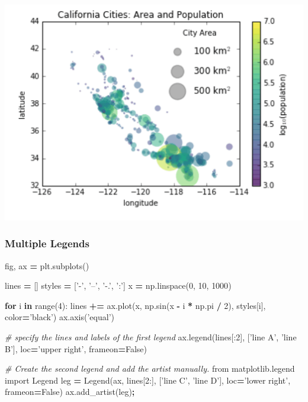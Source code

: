 \documentclass[]{book}
\newenvironment{Shaded}{\begin{snugshade}}{\end{snugshade}}
\newcommand{\BuiltInTok}[1]{#1}
\newcommand{\CommentTok}[1]{\textcolor[rgb]{0.56,0.35,0.01}{\textit{#1}}}
\newcommand{\ControlFlowTok}[1]{\textcolor[rgb]{0.13,0.29,0.53}{\textbf{#1}}}
\newcommand{\DecValTok}[1]{\textcolor[rgb]{0.00,0.00,0.81}{#1}}
\newcommand{\ImportTok}[1]{#1}
\newcommand{\KeywordTok}[1]{\textcolor[rgb]{0.13,0.29,0.53}{\textbf{#1}}}
\newcommand{\NormalTok}[1]{#1}
\newcommand{\OperatorTok}[1]{\textcolor[rgb]{0.81,0.36,0.00}{\textbf{#1}}}
\newcommand{\StringTok}[1]{\textcolor[rgb]{0.31,0.60,0.02}{#1}}
\newcommand{\VariableTok}[1]{\textcolor[rgb]{0.00,0.00,0.00}{#1}}
\begin{document}
\includegraphics{images/legend4.png}

\hypertarget{multiple-legends}{%
\subsubsection{Multiple Legends}\label{multiple-legends}}

\begin{Shaded}
\begin{Highlighting}[]
\NormalTok{fig, ax }\OperatorTok{=}\NormalTok{ plt.subplots()}

\NormalTok{lines }\OperatorTok{=}\NormalTok{ []}
\NormalTok{styles }\OperatorTok{=}\NormalTok{ [}\StringTok{'-'}\NormalTok{, }\StringTok{'--'}\NormalTok{, }\StringTok{'-.'}\NormalTok{, }\StringTok{':'}\NormalTok{]}
\NormalTok{x }\OperatorTok{=}\NormalTok{ np.linspace(}\DecValTok{0}\NormalTok{, }\DecValTok{10}\NormalTok{, }\DecValTok{1000}\NormalTok{)}

\ControlFlowTok{for}\NormalTok{ i }\KeywordTok{in} \BuiltInTok{range}\NormalTok{(}\DecValTok{4}\NormalTok{):}
\NormalTok{    lines }\OperatorTok{+=}\NormalTok{ ax.plot(x, np.sin(x }\OperatorTok{-}\NormalTok{ i }\OperatorTok{*}\NormalTok{ np.pi }\OperatorTok{/} \DecValTok{2}\NormalTok{),}
\NormalTok{                     styles[i], color}\OperatorTok{=}\StringTok{'black'}\NormalTok{)}
\NormalTok{ax.axis(}\StringTok{'equal'}\NormalTok{)}

\CommentTok{# specify the lines and labels of the first legend}
\NormalTok{ax.legend(lines[:}\DecValTok{2}\NormalTok{], [}\StringTok{'line A'}\NormalTok{, }\StringTok{'line B'}\NormalTok{],}
\NormalTok{          loc}\OperatorTok{=}\StringTok{'upper right'}\NormalTok{, frameon}\OperatorTok{=}\VariableTok{False}\NormalTok{)}

\CommentTok{# Create the second legend and add the artist manually.}
\ImportTok{from}\NormalTok{ matplotlib.legend }\ImportTok{import}\NormalTok{ Legend}
\NormalTok{leg }\OperatorTok{=}\NormalTok{ Legend(ax, lines[}\DecValTok{2}\NormalTok{:], [}\StringTok{'line C'}\NormalTok{, }\StringTok{'line D'}\NormalTok{],}
\NormalTok{             loc}\OperatorTok{=}\StringTok{'lower right'}\NormalTok{, frameon}\OperatorTok{=}\VariableTok{False}\NormalTok{)}
\NormalTok{ax.add_artist(leg)}\OperatorTok{;}
\end{Highlighting}
\end{Shaded}
\end{document}
